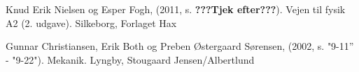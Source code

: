 \begin{thebibliography}{9}


 
  Knud Erik Nielsen og Esper Fogh,
  (2011, s. \textbf{???Tjek efter???}). 
  Vejen til fysik A2 (2. udgave). 
  Silkeborg,
  Forlaget Hax

  Gunnar Christiansen, Erik Both og Preben Østergaard Sørensen,
  (2002, s. "9-11'' - "9-22"). 
  Mekanik. 
  Lyngby,
  Stougaard Jensen/Albertlund
  
  
\end{thebibliography}